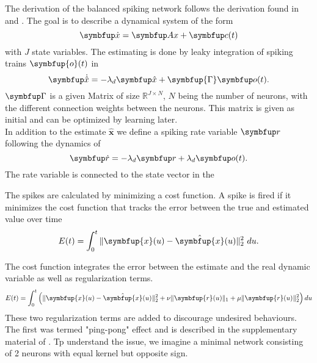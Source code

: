 The derivation of the balanced spiking network follows the derivation found in \cite{boerlin_predictive_2013} and \cite{huang_dynamics_2019}.
The goal is to describe a dynamical system of the form
\begin{equation}\label{eq:x}
	\bmu{\dot{x}} = \bmu{Ax} + \bmu{c}(t)
\end{equation}
with $J$ state variables.
The estimating is done by leaky integration of spiking trains $\symbfup{o}(t)$ in
\begin{equation}\label{eq:x_hat}
	\bmu{\dot{\hat{x}}} = -\lambda_d \bmu{\hat{x}} + \symbfup{\Gamma} \bmu{o}(t).
\end{equation}
$\bmu{\Gamma}$ is a given Matrix of size $\mathbb{R}^{J\times N}$, $N$ being the number of neurons, with the different connection weights between the neurons. This matrix is given as initial and can be optimized by learning later.\\
In addition to the estimate $\bm{\hat{x}}$ we define a spiking rate variable $\bmu{r}$ following the dynamics of
\begin{equation}\label{eq:rate}
	\bmu{\dot{r}} = -\lambda_d\bmu{r} + \lambda_d \bmu{o}(t).
\end{equation}
The rate variable is connected to the state vector in the


The spikes are calculated by minimizing a cost function. A spike is fired if it minimizes the cost function that tracks the error between the true and estimated value over time
\begin{equation}
E(t)=\int_0^t \|\symbfup{x}(u)-\hat{\symbfup{x}}(u)\|_2^2 \ du.
\end{equation}

The cost function integrates the error between the estimate and the real dynamic variable as well as regularization terms.
\begin{equation}\label{eq:cost_func}
E(t)=\int_0^t \left(\|\symbfup{x}(u)-\hat{\symbfup{x}}(u)\|_2^2+\nu\|\symbfup{r}(u)\|_1+\mu\|\symbfup{r}(u)\|_2^2\right)d u
\end{equation}
These two regularization terms are added to discourage undesired behaviours.\\
The first was termed "ping-pong" effect and is described in the supplementary material of \cite{boerlin_predictive_2013}. Tp understand the issue, we imagine a minimal network consisting of 2 neurons with equal kernel but opposite sign. \\

